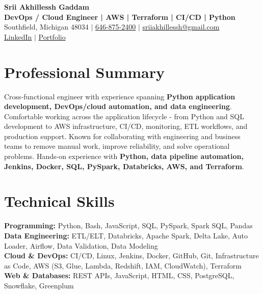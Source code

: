 \documentclass[letterpaper,10pt]{article}
\begin{document}
\fontsize{9.35pt}{10.45pt}\selectfont

\begin{center}
    {\LARGE \textbf{Srii Akhillessh Gaddam}} \\[-1pt]
    \textbf{DevOps / Cloud Engineer | AWS | Terraform | CI/CD | Python} \\[2pt]
    Southfield, Michigan 48034 $|$
    \href{tel:6468752400}{646-875-2400} $|$
    \href{mailto:sriiakhillessh@gmail.com}{sriiakhillessh@gmail.com} \\[1pt]
    \href{https://www.linkedin.com/in/srii-akhiilessh-gaddam-b48668191/}{LinkedIn} $|$
    \href{https://sriiakhillesshg.github.io/portfolio/}{Portfolio}
\end{center}
\vspace{-8pt}

\section{Professional Summary}
\small{Cross-functional engineer with experience spanning \textbf{Python application development, DevOps/cloud automation, and data engineering}. Comfortable working across the application lifecycle - from Python and SQL development to AWS infrastructure, CI/CD, monitoring, ETL workflows, and production support. Known for collaborating with engineering and business teams to remove manual work, improve reliability, and solve operational problems. Hands-on experience with \textbf{Python, data pipeline automation, Jenkins, Docker, SQL, PySpark, Databricks, AWS, and Terraform}.}

\section{Technical Skills}
\small{
\textbf{Programming:} Python, Bash, JavaScript, SQL, PySpark, Spark SQL, Pandas \\
\textbf{Data Engineering:} ETL/ELT, Databricks, Apache Spark, Delta Lake, Auto Loader, Airflow, Data Validation, Data Modeling \\
\textbf{Cloud \& DevOps:} CI/CD, Linux, Jenkins, Docker, GitHub, Git, Infrastructure as Code, AWS (S3, Glue, Lambda, Redshift, IAM, CloudWatch), Terraform \\
\textbf{Web \& Databases:} REST APIs, JavaScript, HTML, CSS, PostgreSQL, Snowflake, Greenplum
}
\end{document}
